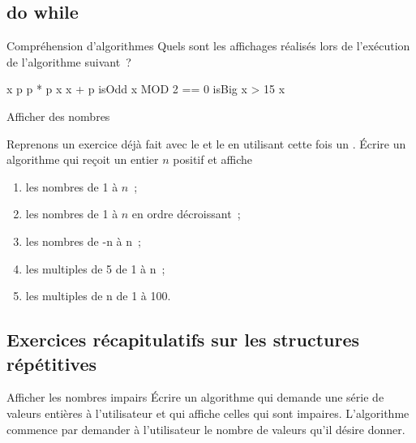 \clearpage
\subsection{do while}

	\begin{Exercice}{Compréhension d’algorithmes}
		Quels sont les affichages réalisés lors de l’exécution
		de l'algorithme suivant~?

		\begin{pseudocode}
				\Let x 
				\Let p 
				\Repeat
					\Let p  * p
					\Let x \Gets x + p
					\Let isOdd \Gets x MOD 2 == 0
					\Let isBig \Gets x > 15
				\Write x
			\EndAlgo
\end{pseudocode}		

		\end{Exercice}

		\begin{Exercice}{Afficher des nombres}

			Reprenons un exercice déjà fait avec le \pc{\algorithmicwhile}
			et le \pc{\algorithmicfor}
			en utilisant cette fois un \pc{\algorithmicrepeat} \pc{\algorithmicwhile}.
			Écrire un algorithme qui reçoit un entier $n$ positif et affiche
			\begin{enumerate}[label=\alph*)]
				\item les nombres de 1 à $n$~;
				\item les nombres de 1 à $n$ en ordre décroissant~;
				\item les nombres de -n à n~;
				\item les multiples de 5 de 1 à n~;
				\item les multiples de n de 1 à 100.
			\end{enumerate}
		\end{Exercice}


		
\subsection{Exercices récapitulatifs sur les structures répétitives}


		\begin{Exercice}{Afficher les nombres impairs}
			Écrire un algorithme qui demande une série
			de valeurs entières à l’utilisateur
			et qui affiche celles qui sont impaires.
			L’algorithme commence par demander à l’utilisateur
			le nombre de valeurs qu’il désire donner.
		\end{Exercice}

